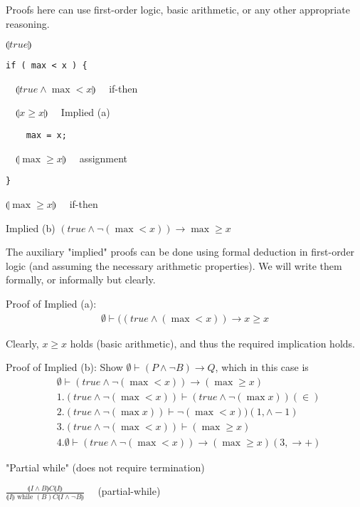 \documentclass{article}
\begin{document}
Proofs here can use first-order logic, basic arithmetic, or any other appropriate reasoning.

$\llparenthesis true \rrparenthesis$
\begin{verbatim}
if ( max < x ) {
\end{verbatim}
$\quad \llparenthesis true \wedge \max < x \rrparenthesis \quad$ if-then

$\quad \llparenthesis x \ge x \rrparenthesis \quad $ Implied (a)

\begin{verbatim}
    max = x;
\end{verbatim}

$\quad \llparenthesis \max \ge x \rrparenthesis \quad$ assignment

\begin{verbatim}
}
\end{verbatim}

$\llparenthesis \max \ge x \rrparenthesis \quad $ if-then

Implied (b) $(true \wedge \neg (\max < x )) \to \max \ge x$

The auxiliary "implied" proofs can be done using formal deduction in first-order logic (and assuming the necessary arithmetic properties). We will write them formally, or informally but clearly.

Proof of Implied (a):
\begin{align*}
    \emptyset \vdash ((true \wedge ( \max < x)) \to x \ge x
\end{align*}

Clearly, $x \ge x$ holds (basic arithmetic), and thus the required implication holds.

Proof of Implied (b): Show $\emptyset \vdash (P \wedge \neg B) \to Q$, which in this case is
\begin{align*}
&\emptyset \vdash (true \wedge \neg (\max < x)) \to (\max \ge x) \\
&1. (true \wedge \neg(\max < x)) \vdash (true \wedge \neg (\max x)) (\in) \\
&2. (true \wedge \neg(\max x)) \vdash \neg(\max < x)) (1, \wedge -1) \\
&3. (true \wedge \neg (\max < x)) \vdash (\max \ge x) \\
&4. \emptyset \vdash (true \wedge \neg (\max < x )) \to (\max \ge x) (3, \to +)
\end{align*}

"Partial while" (does not require termination)

$\frac{\llparenthesis I \wedge B \rrparenthesis C \llparenthesis I \rrparenthesis}{\llparenthesis I \rrparenthesis \text{ while } (B) C \llparenthesis I \wedge \neg B \rrparenthesis} \quad$ (partial-while)
\end{document}
